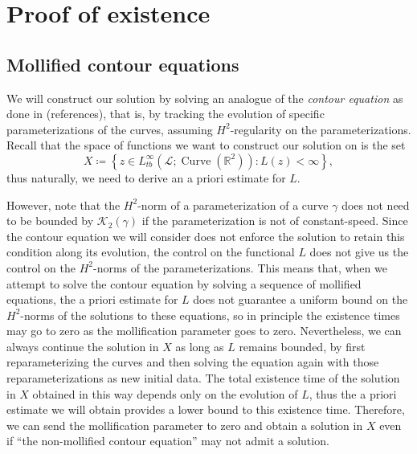 \documentclass[reqno,centertags,12pt]{amsart}
\theoremstyle{definition}
\numberwithin{equation}{section}
\newcommand{\setbc}[2]{\left\{ #1\colon#2 \right\}}
\newcommand{\bbR}{{\mathbb{R}}}
\begin{document}
\section{Proof of existence} \label{S6}

\subsection{Mollified contour equations}

We will construct our solution by solving an analogue of
the \emph{contour equation} as done in (references),
that is, by tracking the evolution of specific parameterizations of the curves,
assuming $H^{2}$-regularity on the parameterizations.
Recall that the space of functions we want to construct our solution on is the set
\[
    X\coloneqq
    \setbc{z\in L_{tb}^{\infty}(\mathcal{L};\operatorname{Curve}(\bbR^{2}))}{L(z)<\infty}, 
\]
thus naturally, we need to derive an a priori estimate for $L$.

However, note that the $H^{2}$-norm of a parameterization of a curve $\gamma$
does not need to be bounded by $\mathcal{K}_{2}(\gamma)$ if the parameterization is
not of constant-speed.
Since the contour equation we will consider does not enforce the solution to retain
this condition along its evolution, the control on the functional $L$ does not give us
the control on the $H^{2}$-norms of the parameterizations. This means that, when we attempt to
solve the contour equation by solving a sequence of mollified equations,
the a priori estimate for $L$ does not guarantee
a uniform bound on the $H^{2}$-norms of the solutions to these equations,
so in principle the existence times may go to zero as the mollification parameter
goes to zero. Nevertheless, we can always continue the solution in
$X$ as long as $L$ remains bounded, by first reparameterizing the curves
and then solving the equation again with those reparameterizations as new initial data.
The total existence time of the solution in $X$ obtained in this way depends only
on the evolution of $L$, thus the a priori estimate
we will obtain provides a lower bound to this existence time.
Therefore, we can send the mollification parameter to zero and obtain a solution in $X$
even if ``the non-mollified contour equation'' may not admit a solution.
\end{document}
